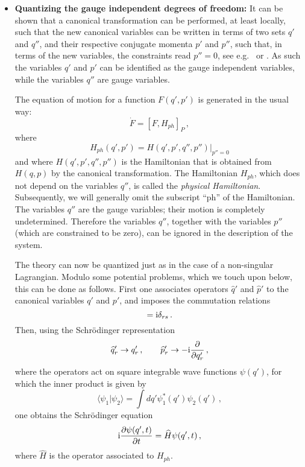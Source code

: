 \documentclass[12pt]{article}
\def\la{\langle}
\def\ra{\rangle}
\def\pa{\partial}
\def\ii{\textrm i}
\begin{document}
\begin{itemize}
\item
{\bf Quantizing the gauge independent degrees of freedom:} It can be shown that a canonical transformation can be performed, at least locally, such that the new canonical variables can be written in terms of two sets $q'$ and $q''$, and their respective conjugate momenta $p'$ and $p''$, such that, in terms of the new variables, the constraints read $p''=0$, see e.g.\ \cite[pp.\ 36-45]{gitman90} or \cite{maskawa76}. As such the variables $q'$ and $p'$ can be identified as the gauge independent variables, while the variables $q''$ are gauge variables. 

The equation of motion for a function $F(q',p')$ is generated in the usual way:
\begin{equation}
\dot{F} = [F,H_{ph}]_P\,,
\label{f.6}
\end{equation}
where 
\begin{equation}
H_{ph}(q',p') = H(q',p',q'',p'')\big|_{p''=0}
\label{f.7}
\end{equation}
and where $H(q',p',q'',p'')$ is the Hamiltonian that is obtained from $H(q,p)$ by the canonical transformation. The Hamiltonian $H_{ph}$, which does not depend on the variables $q''$, is called the {\em physical Hamiltonian}. Subsequently, we will generally omit the subscript ``ph'' of the Hamiltonian. The variables $q''$ are the gauge variables; their motion is completely undetermined. Therefore the variables $q''$, together with the variables $p''$ (which are constrained to be zero), can be ignored in the description of the system.

The theory can now be quantized just as in the case of a non-singular Lagrangian. Modulo some potential problems, which we touch upon below, this can be done as follows. First one associates operators ${\widehat q}'$ and ${\widehat p}'$ to the canonical variables $q'$ and $p'$, and imposes the commutation relations
\begin{equation}
[{\widehat q}'_r,{\widehat p}'_s] = \ii \delta_{rs}\,.
\label{f.8}
\end{equation}
Then, using the Schr\"odinger representation 
\begin{equation}
{\widehat q}'_r \to q'_r\,, \qquad {\widehat p}'_r \to - \ii \frac{\partial}{\partial q'_r} \,,
\label{f.8.1}
\end{equation}
where the operators act on square integrable wave functions $\psi(q')$, for which the inner product is given by 
\begin{equation}
\la \psi_1 | \psi_2 \ra = \int dq' \psi^*_1(q')  \psi_2 (q') \,,
\label{f.8.2}
\end{equation}
one obtains the Schr\"odinger equation 
\begin{equation}
\ii\frac{\pa \psi(q',t) }{\pa t} = {\widehat H} \psi(q',t) \,,
\label{f.8.3}
\end{equation}
where ${\widehat H}$ is the operator associated to $H_{ph}$.


\end{itemize}
\end{document}
